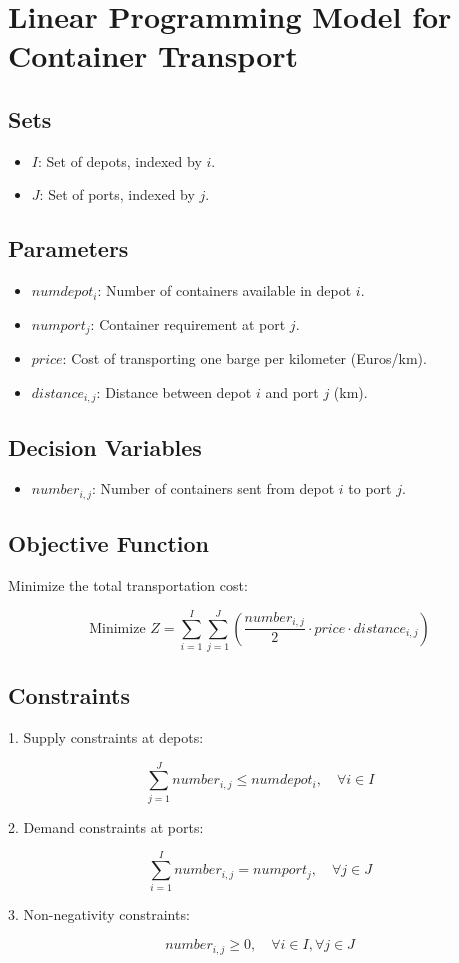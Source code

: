 \documentclass{article}
\begin{document}
\section*{Linear Programming Model for Container Transport}

\subsection*{Sets}
\begin{itemize}
    \item $I$: Set of depots, indexed by $i$.
    \item $J$: Set of ports, indexed by $j$.
\end{itemize}

\subsection*{Parameters}
\begin{itemize}
    \item $numdepot_i$: Number of containers available in depot $i$.
    \item $numport_j$: Container requirement at port $j$.
    \item $price$: Cost of transporting one barge per kilometer (Euros/km).
    \item $distance_{i,j}$: Distance between depot $i$ and port $j$ (km).
\end{itemize}

\subsection*{Decision Variables}
\begin{itemize}
    \item $number_{i,j}$: Number of containers sent from depot $i$ to port $j$.
\end{itemize}

\subsection*{Objective Function}
Minimize the total transportation cost:

\[
\text{Minimize } Z = \sum_{i=1}^{I} \sum_{j=1}^{J} \left( \frac{number_{i,j}}{2} \cdot price \cdot distance_{i,j} \right)
\]

\subsection*{Constraints}
1. Supply constraints at depots:

\[
\sum_{j=1}^{J} number_{i,j} \leq numdepot_i, \quad \forall i \in I
\]

2. Demand constraints at ports:

\[
\sum_{i=1}^{I} number_{i,j} = numport_j, \quad \forall j \in J
\]

3. Non-negativity constraints:

\[
number_{i,j} \geq 0, \quad \forall i \in I, \forall j \in J
\]
\end{document}
